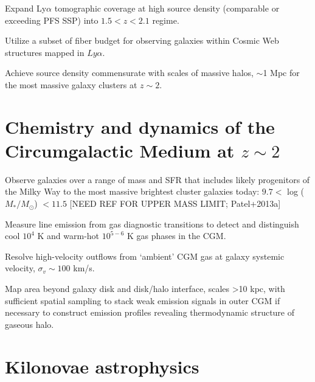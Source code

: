 \documentclass[11pt,a4paper,twoside,onecolumn,openany,final,oldfontcommands]{memoir}
\begin{document}

\begin{programrequirement}
\reqitem Expand Ly$\alpha$ tomographic coverage at high source density (comparable or exceeding PFS SSP) into $1.5 < z < 2.1$ regime.

\reqitem Utilize a subset of fiber budget for observing galaxies within Cosmic Web structures mapped in $Ly\alpha$.

\reqitem Achieve source density commensurate with scales of massive halos, $\sim$1 Mpc for the most massive galaxy clusters at $z\sim 2$.
\end{programrequirement}

\section{Chemistry and dynamics of the Circumgalactic Medium at $z\sim2$}
\begin{programrequirement}
\reqitem Observe galaxies over a range of mass and SFR that includes likely progenitors of the Milky Way to the most massive brightest cluster galaxies today: $9.7 <$ log ($M_*/M_\odot$) $< 11.5$ [NEED REF FOR UPPER MASS LIMIT; Patel+2013a]

\reqitem Measure line emission from gas diagnostic transitions to detect and distinguish cool $10^4$ K and warm-hot $10^{5-6}$ K gas phases in the CGM.

\reqitem Resolve high-velocity outflows from `ambient' CGM gas at galaxy systemic velocity, $\sigma_v \sim 100$ km/s.  

\reqitem Map area beyond galaxy disk and disk/halo interface, scales >10 kpc, with sufficient spatial sampling to stack weak emission signals in outer CGM if necessary to construct emission profiles revealing thermodynamic structure of gaseous halo.  

\end{programrequirement}


\section{Kilonovae astrophysics}
\end{document}
